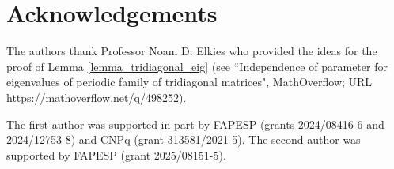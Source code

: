 \documentclass[11pt]{amsart}
\numberwithin{theorem}{section}
\numberwithin{equation}{section}
\theoremstyle{definition}
\numberwithin{example}{section}
\theoremstyle{definition}
\theoremstyle{definition}
\begin{document}
 

\section{Acknowledgements}
The authors thank Professor Noam D. Elkies who provided the ideas for the proof of Lemma \ref{lemma_tridiagonal_eig} (see ``Independence of parameter for eigenvalues of periodic family of
tridiagonal matrices", MathOverflow; URL \url{https://mathoverflow.net/q/498252}).

The first author was supported in part by FAPESP (grants 2024/08416-6 and 2024/12753-8) and CNPq (grant 313581/2021-5). The second author was supported by FAPESP (grant 2025/08151-5).
 
  
\end{document}
